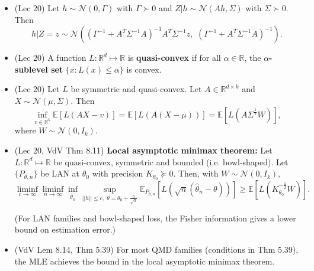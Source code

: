 \documentclass[twoside]{article}
\newcommand\bbE{\mathbb{E}}
\newcommand\bbR{\mathbb{R}}
\newcommand\calN{\mathcal{N}}
\def\t{\theta}
\newcommand\goesto{\rightarrow}
\begin{document}
\begin{itemize}
\item (Lec 20) Let $h \sim \calN(0, \Gamma)$ with $\Gamma \succ 0$ and $Z|h \sim \calN(Ah, \Sigma)$ with $\Sigma \succ 0$. Then 
\[h |Z=z \sim \mathcal{N}\left((\Gamma^{-1} + A^T\Sigma^{-1}A)^{-1}A^T \Sigma^{-1} z, \,\,(\Gamma^{-1} + A^T\Sigma^{-1}A)^{-1}\right).\]

\item (Lec 20) A function $L: \bbR^d\mapsto \bbR$ is \textbf{quasi-convex} if for all $\alpha \in \bbR$, the \textbf{$\alpha$-sublevel set} $ \{x: L(x) \leq \alpha \}$ is convex.

\item (Lec 20) Let $L$ be symmetric and quasi-convex. Let $A \in \bbR^{d \times k}$ and $X \sim \mathcal{N}(\mu, \Sigma)$. Then
\[\inf_{v \in \bbR^k} \bbE\left[L(AX-v)\right] = \bbE\left[L(A(X-\mu))\right] = \bbE\left[L(A \Sigma^{\frac{1}{2}}W)\right],\]
where $W \sim \calN(0, I_k)$.

\item (Lec 20, VdV Thm 8.11) \textbf{Local asymptotic minimax theorem:} Let $L: \bbR^d \mapsto \bbR$ be quasi-convex, symmetric and bounded (i.e. bowl-shaped). Let $\{P_{\t,n}\}$ be LAN at $\t_0$ with precision $K_{\t_0} \succeq 0$. Then, with $W \sim \calN(0, I_k)$,
\[\liminf_{c \goesto \infty} \liminf_{n \goesto \infty} \inf_{\hat{\theta}_n} \sup_{||h|| \le c,\,\, \theta = \theta_0 + \frac{h}{\sqrt{n}}} \mathbb{E}_{P_{\theta, n}} \left[ L(\sqrt{n} (\hat{\theta}_n - \theta)) \right] \ge \mathbb{E}\left[L(K_{\theta_0}^{-\frac{1}{2}} W)\right]. \]

(For LAN families and bowl-shaped loss, the Fisher information gives a lower bound on estimation error.)

\item (VdV Lem 8.14, Thm 5.39) For most QMD families (conditions in Thm 5.39), the MLE achieves the bound in the local asymptotic minimax theorem.

\end{itemize}


\end{document}
